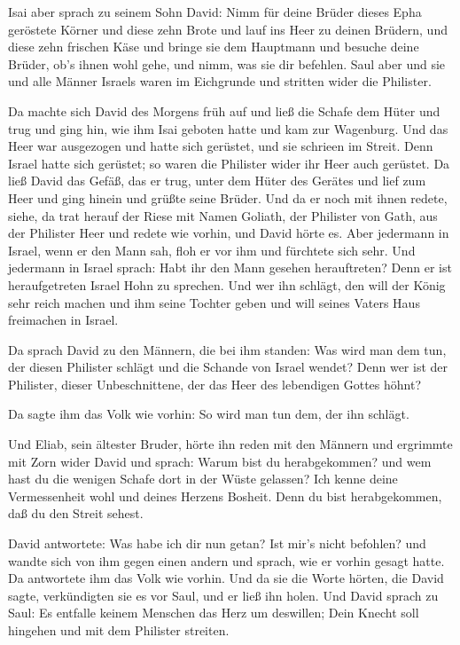  Isai aber sprach zu seinem Sohn David: Nimm für deine
Brüder dieses Epha geröstete Körner und diese zehn Brote und lauf ins
Heer zu deinen Brüdern,  und diese zehn frischen Käse und
bringe sie dem Hauptmann und besuche deine Brüder, ob's ihnen wohl gehe,
und nimm, was sie dir befehlen.  Saul aber und sie und alle
Männer Israels waren im Eichgrunde und stritten wider die Philister.

 Da machte sich David des Morgens früh auf und ließ die
Schafe dem Hüter und trug und ging hin, wie ihm Isai geboten hatte und
kam zur Wagenburg. Und das Heer war ausgezogen und hatte sich gerüstet,
und sie schrieen im Streit.  Denn Israel hatte sich
gerüstet; so waren die Philister wider ihr Heer auch gerüstet.
 Da ließ David das Gefäß, das er trug, unter dem Hüter des
Gerätes und lief zum Heer und ging hinein und grüßte seine Brüder.
 Und da er noch mit ihnen redete, siehe, da trat herauf der
Riese mit Namen Goliath, der Philister von Gath, aus der Philister Heer
und redete wie vorhin, und David hörte es.  Aber jedermann
in Israel, wenn er den Mann sah, floh er vor ihm und fürchtete sich
sehr.  Und jedermann in Israel sprach: Habt ihr den Mann
gesehen herauftreten? Denn er ist heraufgetreten Israel Hohn zu
sprechen. Und wer ihn schlägt, den will der König sehr reich machen und
ihm seine Tochter geben und will seines Vaters Haus freimachen in
Israel.

 Da sprach David zu den Männern, die bei ihm standen: Was
wird man dem tun, der diesen Philister schlägt und die Schande von
Israel wendet? Denn wer ist der Philister, dieser Unbeschnittene, der
das Heer des lebendigen Gottes höhnt?

 Da sagte ihm das Volk wie vorhin: So wird man tun dem, der
ihn schlägt.

 Und Eliab, sein ältester Bruder, hörte ihn reden mit den
Männern und ergrimmte mit Zorn wider David und sprach: Warum bist du
herabgekommen? und wem hast du die wenigen Schafe dort in der Wüste
gelassen? Ich kenne deine Vermessenheit wohl und deines Herzens Bosheit.
Denn du bist herabgekommen, daß du den Streit sehest.

 David antwortete: Was habe ich dir nun getan? Ist mir's
nicht befohlen?  und wandte sich von ihm gegen einen andern
und sprach, wie er vorhin gesagt hatte. Da antwortete ihm das Volk wie
vorhin.  Und da sie die Worte hörten, die David sagte,
verkündigten sie es vor Saul, und er ließ ihn holen.  Und
David sprach zu Saul: Es entfalle keinem Menschen das Herz um deswillen;
Dein Knecht soll hingehen und mit dem Philister streiten.

